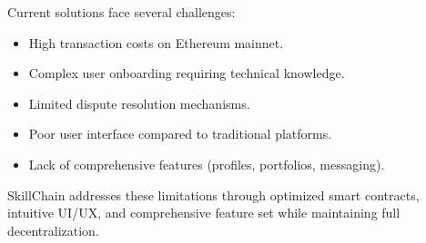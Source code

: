 Current solutions face several challenges:
\begin{itemize}
    \item High transaction costs on Ethereum mainnet.
    \item Complex user onboarding requiring technical knowledge.
    \item Limited dispute resolution mechanisms.
    \item Poor user interface compared to traditional platforms.
    \item Lack of comprehensive features (profiles, portfolios, messaging).
\end{itemize}

SkillChain addresses these limitations through optimized smart contracts, intuitive UI/UX, and comprehensive feature set while maintaining full decentralization.